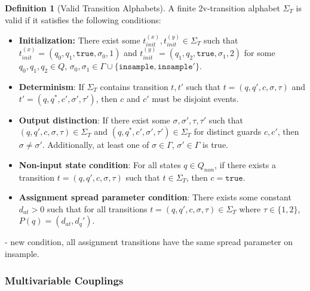 \documentclass[12pt]{article}
\theoremstyle{definition}
\newtheorem{defn}[thm]{Definition}
\begin{document}
\begin{defn}[Valid Transition Alphabets]
    A finite 2v-transition alphabet $\Sigma_T$ is valid if it satisfies the following conditions: 
    \begin{itemize}
        \item \textbf{Initialization:} There exist some $t_{init}^{(x)}, t_{init}^{(y)}\in \Sigma_T$ such that $t_{init}^{(x)} = (q_0, q_1, \texttt{true}, \sigma_0, 1)$ and $t_{init}^{(y)} = (q_1, q_2, \texttt{true}, \sigma_1, 2)$ for some $q_0, q_1, q_2\in Q$, $\sigma_0, \sigma_1 \in \Gamma\cup\{\texttt{insample}, \texttt{insample}'\}$. 
        \item \textbf{Determinism}: If $\Sigma_T$ contains transition $t, t'$ such that $t=(q, q', c, \sigma, \tau)$ and $t'= (q, q^*, c', \sigma', \tau')$, then $c$ and $c'$ must be disjoint events. 
        \item \textbf{Output distinction}: If there exist some $\sigma, \sigma', \tau, \tau'$ such that $(q, q', c, \sigma, \tau)\in \Sigma_T$  and $(q, q^*, c', \sigma', \tau') \in \Sigma_T$ for distinct guards $c, c'$, then $\sigma \neq \sigma'$. Additionally, at least one of $\sigma\in \Gamma$, $\sigma'\in \Gamma$ is true.
        \item \textbf{Non-input state condition}: For all states $q\in Q_{non}$, if there exists a transition $t=(q, q', c, \sigma, \tau)$ such that $t\in \Sigma_T$, then $c = \texttt{true}$.
        \item \textbf{Assignment spread parameter condition}: There exists some constant $d_{at}>0$ such that for all transitions $t = (q, q', c, \sigma, \tau)\in \Sigma_T$ where $\tau \in \{1, 2\}$, $P(q) = (d_{at}, d_q')$.
    \end{itemize}
\end{defn}

- new condition, all assignment transitions have the same spread parameter on insample. 

\subsubsection{Multivariable Couplings}
\end{document}
